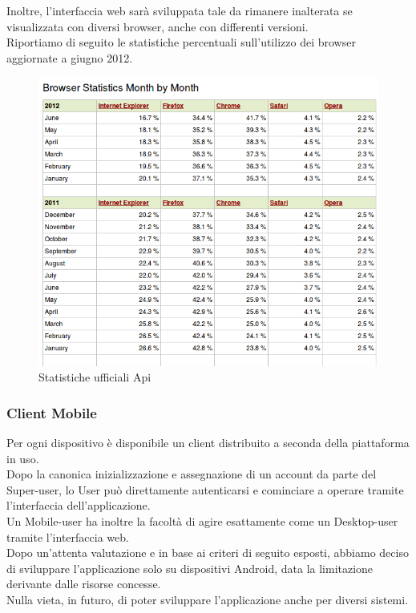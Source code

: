 Inoltre, l'interfaccia web sarà sviluppata tale da rimanere inalterata se visualizzata con diversi browser, anche con differenti versioni.\\
Riportiamo di seguito le statistiche percentuali sull'utilizzo dei browser aggiornate a giugno 2012.

\begin{figure}[H]
\centering
\caption{Statistiche ufficiali Api}
\includegraphics[scale=0.55]{images/internetStat} 
\end{figure}


\subsubsection{Client Mobile}
Per ogni dispositivo è disponibile un client distribuito a seconda della piattaforma in uso.\\
Dopo la canonica inizializzazione e assegnazione di un account da parte del Super-user, lo User può direttamente autenticarsi e cominciare a operare tramite l’interfaccia dell’applicazione.\\ 
Un Mobile-user ha inoltre la facoltà di agire esattamente come un Desktop-user tramite l’interfaccia web.\\
Dopo un'attenta valutazione e in base ai criteri di seguito esposti, abbiamo deciso di sviluppare l'applicazione solo su dispositivi Android, data la limitazione derivante dalle risorse concesse.\\
Nulla vieta, in futuro, di poter sviluppare l'applicazione anche per diversi sistemi.

